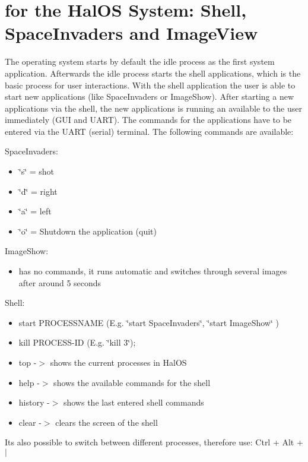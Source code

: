 \hypertarget{installation_Commands}{}\section{for the HalOS System: Shell, SpaceInvaders and ImageView}\label{installation_Commands}
The operating system starts by default the idle process as the first system application. Afterwards the idle process starts the shell applications, which is the basic process for user interactions. With the shell application the user is able to start new applications (like SpaceInvaders or ImageShow). After starting a new applications via the shell, the new applications is running an available to the user immediately (GUI and UART). The commands for the applications have to be entered via the UART (serial) terminal. The following commands are available:

SpaceInvaders: \begin{itemize}
\item \char`\"{}s\char`\"{} = shot \item \char`\"{}d\char`\"{} = right \item \char`\"{}a\char`\"{} = left \item \char`\"{}o\char`\"{} = Shutdown the application (quit)\end{itemize}
ImageShow:\begin{itemize}
\item has no commands, it runs automatic and switches through several images after around 5 seconds\end{itemize}


Shell:\begin{itemize}
\item start PROCESSNAME (E.g. \char`\"{}start SpaceInvaders\char`\"{}, \char`\"{}start ImageShow\char`\"{} )\item kill PROCESS-ID (E.g. \char`\"{}kill 3\char`\"{});\item top -$>$ shows the current processes in HalOS\item help -$>$ shows the available commands for the shell\item history -$>$ shows the last entered shell commands\item clear -$>$ clears the screen of the shell\end{itemize}


Its also possible to switch between different processes, therefore use: Ctrl + Alt + $|$ 